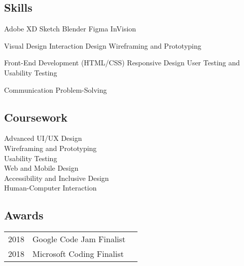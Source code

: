 \documentclass[letterpaper]{resume} %
\begin{document}
\begin{minipage}[t]{0.33\textwidth}
\sectionspace %
\sectionspace


\subsection{Skills}

Adobe XD \textbullet{} Sketch \textbullet{} Blender \textbullet{} Figma \textbullet{} InVision\\ 
\smallskip

Visual Design \textbullet{} Interaction Design \textbullet{} Wireframing and Prototyping \\ 
\smallskip

Front-End Development (HTML/CSS) \textbullet{} Responsive Design \textbullet{} User Testing and Usability Testing \\
\smallskip

Communication \textbullet{} Problem-Solving \\

\sectionspace %
\sectionspace


\subsection{Coursework}

Advanced UI/UX Design \\
Wireframing and Prototyping \\
Usability Testing \\
Web and Mobile Design \\
Accessibility and Inclusive Design \\
Human-Computer Interaction \\

\sectionspace %
\sectionspace



\subsection{Awards} 

\begin{tabular}{rll}
2018 & Google Code Jam Finalist \\
2018 & Microsoft Coding Finalist \\
\end{tabular}

\sectionspace %


\end{minipage} %
\end{document}
